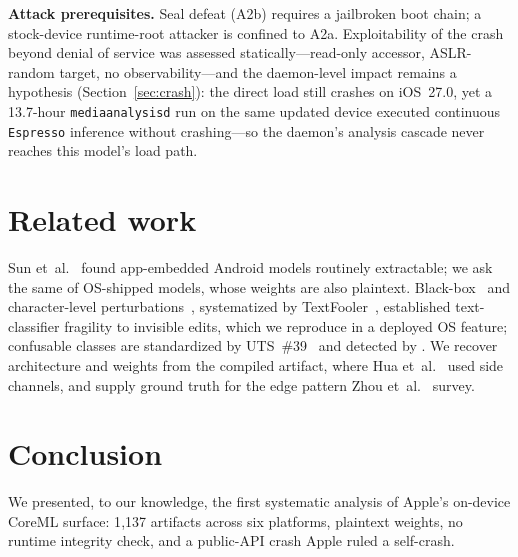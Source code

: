 \documentclass[letterpaper,twocolumn,10pt]{article}
\begin{document}
\textbf{Attack prerequisites.} Seal defeat (A2b) requires a jailbroken boot
chain; a stock-device runtime-root attacker is confined to A2a.
Exploitability of the crash beyond denial of service was assessed
statically---read-only accessor, ASLR-random target, no observability---and
the daemon-level impact remains a hypothesis (Section~\ref{sec:crash}):
the direct load still crashes on iOS~27.0, yet a 13.7-hour
\texttt{mediaanalysisd} run on the same updated device executed continuous
\texttt{Espresso} inference without crashing---so the daemon's analysis
cascade never reaches this model's load path.

\section{Related work}
\label{sec:related}

Sun et~al.~\cite{mobile_audit} found app-embedded Android models routinely
extractable; we ask the same of OS-shipped models, whose weights are also
plaintext. Black-box~\cite{papernot_blackbox} and character-level
perturbations~\cite{bad_characters}, systematized by
TextFooler~\cite{textfooler}, established text-classifier fragility to
invisible edits, which we reproduce in a deployed OS feature; confusable
classes are standardized by UTS~\#39~\cite{unicode_tr39} and detected by
\cite{homoglyph_detection}. We recover architecture and weights from the
compiled artifact, where Hua et~al.~\cite{hua_dac} used side channels, and
supply ground truth for the edge pattern Zhou et~al.~\cite{edge_intelligence}
survey.

\section{Conclusion}
\label{sec:conclusion}

We presented, to our knowledge, the first systematic analysis of Apple's
on-device CoreML surface: 1{,}137 artifacts across six platforms, plaintext
weights, no runtime integrity check, and a public-API crash Apple ruled a
self-crash.
\end{document}
